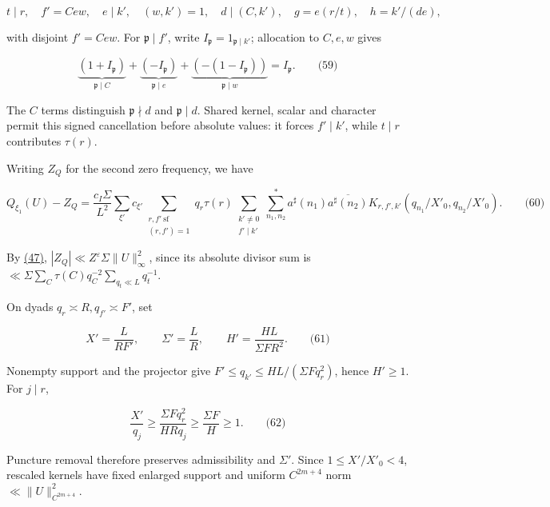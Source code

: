 \[
t\mid r,\quad f'=Cew,\quad e\mid k',\quad(w,k')=1,
\quad d\mid(C,k'),\quad g=e(r/t),\quad h=k'/(de),
\]

with disjoint \(f'=Cew\). For \(\mathfrak p\mid f'\), write \(I_{\mathfrak p}=1_{\mathfrak p\mid k'}\); allocation to \(C,e,w\) gives

\hypertarget{cf:eq:C.15}{}

\label{cf:eq:C.15}

\[
\underbrace{(1+I_{\mathfrak p})}_{\mathfrak p\mid C}
+\underbrace{(-I_{\mathfrak p})}_{\mathfrak p\mid e}
+\underbrace{(-(1-I_{\mathfrak p}))}_{\mathfrak p\mid w}
=I_{\mathfrak p}.
\qquad\text{(59)}
\]

The \(C\) terms distinguish \(\mathfrak p\nmid d\) and \(\mathfrak p\mid d\). Shared kernel, scalar and character permit this signed cancellation before absolute values: it forces \(f'\mid k'\), while \(t\mid r\) contributes \(\tau(r)\).

Writing \(Z_Q\) for the second zero frequency, we have

\hypertarget{cf:eq:C.16}{}

\label{cf:eq:C.16}

\[
Q_{\xi_1}(U)-Z_Q=
\frac{c_I\Sigma}{L^2}\sum_{\xi'}c_{\xi'}
\sum_{\substack{r,f'\ \mathrm{sf}\\(r,f')=1}}q_r\tau(r)
\sum_{\substack{k'\ne0\\f'\mid k'}}\sum_{n_1,n_2}^{*}
a^\sharp(n_1)\overline{a^\sharp(n_2)}
K_{r,f',k'}(q_{n_1}/X'_0,q_{n_2}/X'_0).
\qquad\text{(60)}
\]

By \protect\hyperlink{cf:eq:C.3}{(47)}, \(|Z_Q|\ll Z^\varepsilon\Sigma\|U\|_\infty^2\), since its absolute divisor sum is \(\ll\Sigma\sum_C\tau(C)q_C^{-2}\sum_{q_t\ll L}q_t^{-1}\).

On dyads \(q_r\asymp R,q_{f'}\asymp F'\), set

\hypertarget{cf:eq:C.17}{}

\label{cf:eq:C.17}

\[
X'=\frac L{RF'},\qquad \Sigma'=\frac LR,
\qquad H'=\frac{HL}{\Sigma FR^2}.
\qquad\text{(61)}
\]

Nonempty support and the projector give \(F'\le q_{k'}\le HL/(\Sigma Fq_r^2)\), hence \(H'\ge1\). For \(j\mid r\),

\hypertarget{cf:eq:C.18}{}

\label{cf:eq:C.18}

\[
\frac{X'}{q_j}\ge\frac{\Sigma Fq_r^2}{HRq_j}
\ge\frac{\Sigma F}{H}\ge1.
\qquad\text{(62)}
\]

Puncture removal therefore preserves admissibility and \(\Sigma'\). Since \(1\le X'/X'_0<4\), rescaled kernels have fixed enlarged support and uniform \(C^{2m+4}\) norm \(\ll\|U\|_{C^{2m+4}}^2\).

